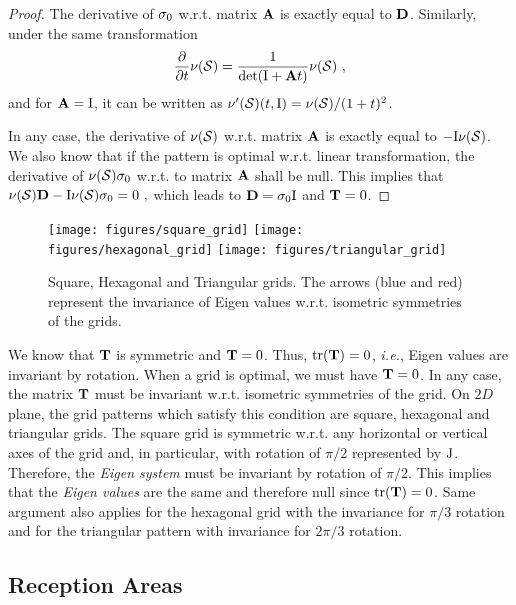 \documentclass[12pt,english]{article}
\begin{document}
\begin{proof}
The derivative of $\ss_0$ w.r.t. matrix $\BA$ is exactly equal to $\BD$. 
Similarly, under the same transformation
$$
\frac{\partial}{\partial t}\nu({\cal S})=\frac{1}{\det(\BI+\BA t)}\nu({\cal S})~,
$$
and for $\BA=\BI$, it can be written as $\nu'({\cal S})(t,\BI)=\nu({\cal S})/(1+t)^2$.

In any case, the derivative of $\nu({\cal S})$ w.r.t. matrix $\BA$ is exactly equal to $-\BI\nu({\cal S})$. 
We also know that if the pattern is optimal w.r.t. linear transformation, the derivative of $\nu({\cal S})\ss_0$ w.r.t. to matrix $\BA$ shall be null. This implies that
$
\nu({\cal S})\BD-\BI\nu({\cal S})\ss_0=0~,
$
which leads to $\BD=\ss_0\BI$ and $\BT=0$.
\end{proof}

\begin{figure}[!t]
\centering
{}
\texttt{[image: figures/square\_grid]}
\texttt{[image: figures/hexagonal\_grid]}
\texttt{[image: figures/triangular\_grid]}
\caption{Square, Hexagonal and Triangular grids. The arrows (blue and red) represent the invariance of Eigen values w.r.t. isometric symmetries of the grids.}
\label{fig:grid_layouts}
\end{figure}

We know that $\BT$ is symmetric and $\BT=0$. Thus, \mbox{$\tr(\BT)=0$}, {\it i.e.}, Eigen values are invariant by rotation. When a grid is optimal, we must have \mbox{$\BT=0$}. In any case, the matrix $\BT$ must be invariant w.r.t. isometric symmetries of the grid. On $2D$ plane, the grid patterns which satisfy this condition are square, hexagonal and triangular grids. The square grid is symmetric w.r.t. any horizontal or vertical axes of the grid and, in particular, with rotation of $\pi/2$ represented by $\BJ$. Therefore, the {\em Eigen system} must be invariant by rotation of $\pi/2$. This implies that the {\em Eigen values} are the same and therefore null since \mbox{$\tr(\BT)=0$}. Same argument also applies for the hexagonal grid with the invariance for $\pi/3$ rotation and for the triangular pattern with invariance for $2\pi/3$ rotation. 




\subsection{Reception Areas}
\label{sec:rx_area_2}
\end{document}
